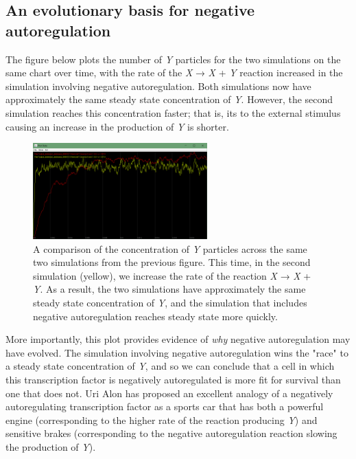 
\FloatBarrier
{}
\subsection{An evolutionary basis for negative autoregulation}

The figure below plots the number of \textit{Y} particles for the two simulations on the same chart over time, with the rate of the \textit{X} → \textit{X} + \textit{Y} reaction increased in the simulation involving negative autoregulation. Both  simulations now have approximately the same steady state concentration of \textit{Y}. However, the second simulation reaches this concentration faster; that is, its  to the external stimulus causing an increase in the production of \textit{Y} is shorter.

\begin{figure}[h]
\centering
\mySfFamily
\includegraphics[width = 0.6\textwidth]{../images/nar_equal_chart.png}
\caption{A comparison of the concentration of \textit{Y} particles across the same two simulations from the previous figure. This time, in the second simulation (yellow), we increase the rate of the reaction \textit{X} → \textit{X} + \textit{Y}.  As a result, the two simulations have approximately the same steady state concentration of \textit{Y}, and the simulation that includes negative autoregulation reaches steady state more quickly.}
\label{fig:nar_equal_chart}
\end{figure}

More importantly, this plot provides evidence of \textit{why} negative autoregulation may have evolved. The simulation involving negative autoregulation wins the "race" to a steady state concentration of \textit{Y}, and so we can conclude that a cell in which this transcription factor is negatively autoregulated is more fit for survival than one that does not. Uri Alon has proposed an excellent analogy of a negatively autoregulating transcription factor as a sports car that has both a powerful engine (corresponding to the higher rate of the reaction producing \textit{Y}) and sensitive brakes (corresponding to the negative autoregulation reaction slowing the production of \textit{Y}).

